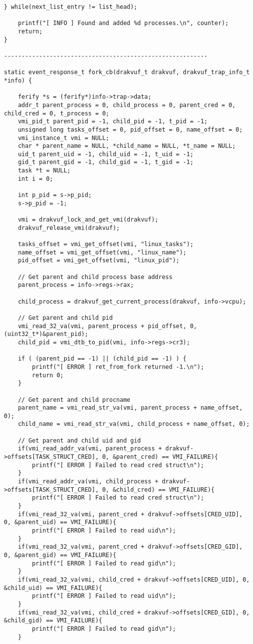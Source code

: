 {\begin{lstlisting}[style=CStyle]
	} while(next_list_entry != list_head);
	
	printf("[ INFO ] Found and added %d processes.\n", counter);
	return;
}

----------------------------------------------------------

static event_response_t fork_cb(drakvuf_t drakvuf, drakvuf_trap_info_t *info) {

	ferify *s = (ferify*)info->trap->data;
	addr_t parent_process = 0, child_process = 0, parent_cred = 0, child_cred = 0, t_process = 0;
	vmi_pid_t parent_pid = -1, child_pid = -1, t_pid = -1;
	unsigned long tasks_offset = 0, pid_offset = 0, name_offset = 0;
	vmi_instance_t vmi = NULL;
	char * parent_name = NULL, *child_name = NULL, *t_name = NULL;
	uid_t parent_uid = -1, child_uid = -1, t_uid = -1;
	gid_t parent_gid = -1, child_gid = -1, t_gid = -1;
	task *t = NULL;
	int i = 0;
	
	int p_pid = s->p_pid;
	s->p_pid = -1;
	
	vmi = drakvuf_lock_and_get_vmi(drakvuf); 
	drakvuf_release_vmi(drakvuf);
	
	tasks_offset = vmi_get_offset(vmi, "linux_tasks");
	name_offset = vmi_get_offset(vmi, "linux_name");
	pid_offset = vmi_get_offset(vmi, "linux_pid");
	
	// Get parent and child process base address
	parent_process = info->regs->rax;
	
	child_process = drakvuf_get_current_process(drakvuf, info->vcpu);
	
	// Get parent and child pid
	vmi_read_32_va(vmi, parent_process + pid_offset, 0, (uint32_t*)&parent_pid);
	child_pid = vmi_dtb_to_pid(vmi, info->regs->cr3);
	
	if ( (parent_pid == -1) || (child_pid == -1) ) {
		printf("[ ERROR ] ret_from_fork returned -1.\n");
		return 0;
	}
	
	// Get parent and child procname
	parent_name = vmi_read_str_va(vmi, parent_process + name_offset, 0);
	child_name = vmi_read_str_va(vmi, child_process + name_offset, 0);
	
	// Get parent and child uid and gid
	if(vmi_read_addr_va(vmi, parent_process + drakvuf->offsets[TASK_STRUCT_CRED], 0, &parent_cred) == VMI_FAILURE){
		printf("[ ERROR ] Failed to read cred struct\n");
	}
	if(vmi_read_addr_va(vmi, child_process + drakvuf->offsets[TASK_STRUCT_CRED], 0, &child_cred) == VMI_FAILURE){
		printf("[ ERROR ] Failed to read cred struct\n");
	}
	if(vmi_read_32_va(vmi, parent_cred + drakvuf->offsets[CRED_UID], 0, &parent_uid) == VMI_FAILURE){
		printf("[ ERROR ] Failed to read uid\n");
	}
	if(vmi_read_32_va(vmi, parent_cred + drakvuf->offsets[CRED_GID], 0, &parent_gid) == VMI_FAILURE){
		printf("[ ERROR ] Failed to read gid\n");
	}	
	if(vmi_read_32_va(vmi, child_cred + drakvuf->offsets[CRED_UID], 0, &child_uid) == VMI_FAILURE){
		printf("[ ERROR ] Failed to read uid\n");
	}
	if(vmi_read_32_va(vmi, child_cred + drakvuf->offsets[CRED_GID], 0, &child_gid) == VMI_FAILURE){
		printf("[ ERROR ] Failed to read gid\n");
	}	
	

\end{lstlisting}}
